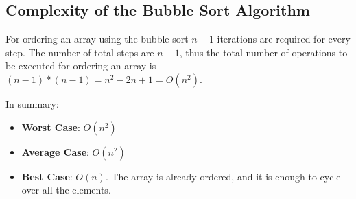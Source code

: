 \subsection{Complexity of the Bubble Sort Algorithm}
For ordering an array using the bubble sort \(n - 1\) iterations are required for every step. The number of total steps are \(n - 1\), thus the total number of operations to be executed for ordering an array is \((n - 1)*(n - 1) = n^{2} - 2n + 1 = O(n^{2})\).

In summary:
\begin{itemize}
\item \textbf{Worst Case}: \(O(n^{2})\)
\item \textbf{Average Case}: \(O(n^{2})\)
\item \textbf{Best Case}: \(O(n)\). The array is already ordered, and it is enough to cycle over all the elements.
\end{itemize} 

